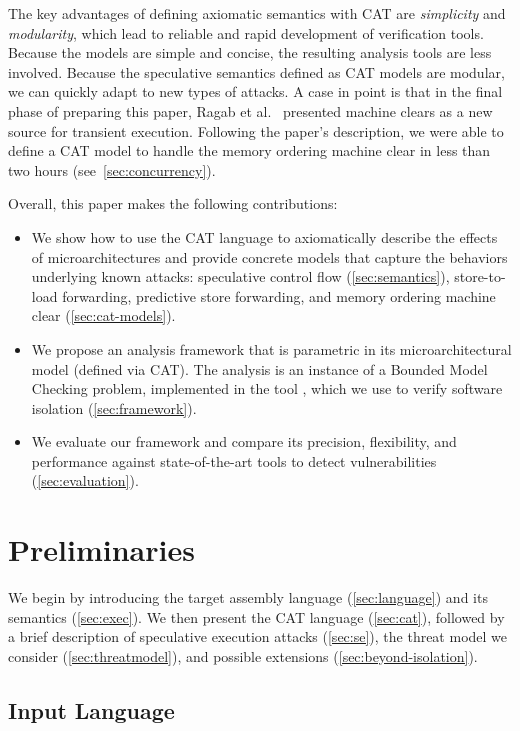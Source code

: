 \documentclass[conference]{IEEEtran}
\begin{document}
The key advantages of defining axiomatic semantics with CAT are \emph{simplicity} and \emph{modularity}, which lead to reliable and rapid development of verification tools.
%
Because the models are simple and concise, the resulting analysis tools are less involved. 
%  
Because the speculative semantics defined as CAT models are modular, we can quickly adapt to new types of attacks. A case in point is that in the final phase of preparing this paper, Ragab et al.~\cite{ragab_rage_2021} presented machine clears as a new source for transient execution. Following the paper's description, we were able to define a CAT model to handle the memory ordering machine clear in less than two hours (see~\autoref{sec:concurrency}).

Overall, this paper makes the following contributions:
\begin{itemize}
  \item We show how to use the CAT language to axiomatically describe the effects of microarchitectures and provide concrete models that capture the behaviors underlying known \spectre attacks: speculative control flow (\autoref{sec:semantics}), store-to-load forwarding, predictive store forwarding, and memory ordering machine clear (\autoref{sec:cat-models}).
  \item We propose an analysis framework that is parametric in its microarchitectural model (defined via CAT). The analysis is an instance of a Bounded Model Checking problem, implemented in the tool \zombmc, which we use to verify software isolation (\autoref{sec:framework}).
  \item We evaluate our framework and compare its precision, flexibility, and performance against state-of-the-art tools to detect \spectre vulnerabilities (\autoref{sec:evaluation}).
\end{itemize}

\section{Preliminaries}
\label{sec:preliminaries}

We begin by introducing the target assembly language (\autoref{sec:language}) and its semantics (\autoref{sec:exec}). 
We then present the CAT language (\autoref{sec:cat}), followed by a brief description of speculative execution attacks (\autoref{sec:se}), the threat model we consider (\autoref{sec:threatmodel}), and possible extensions (\autoref{sec:beyond-isolation}).

\subsection{Input Language}
\label{sec:language}
\end{document}
